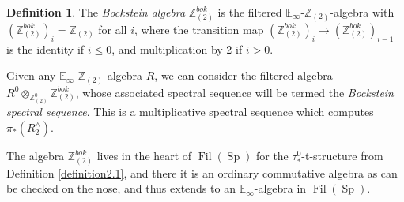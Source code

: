 \documentclass[11pt,leqno]{article}
\newcommand{\zz}{\mathbb{Z}}
\newcommand{\bb}[1]{\mathbb{#1}}
\newcommand{\mo}[1]{\operatorname{#1}}
\newtheorem*{short hand}{theorem name}
\theoremstyle{plain}  %
\theoremstyle{definition}
\newtheorem{definition}{Definition}[section]
\numberwithin{equation}{section}
\begin{document}
\begin{definition}\label{definition2.10}
The \textit{Bockstein algebra} $\zz_{(2)}^{bok}$ is the filtered $\bb{E}_{\infty}\text{-}\zz_{(2)}$-algebra with $(\zz_{(2)}^{bok})_i=\zz_{(2)}$ for all $i$, where the transition map $(\zz_{(2)}^{bok})_i\to (\zz_{(2)}^{bok})_{i-1}$ is the identity if $i\leq 0$, and multiplication by 2 if $i>0$.

Given any $\bb{E}_{\infty}\text{-}\zz_{(2)}$-algebra $R$, we can consider the filtered algebra $R^0\otimes_{\zz_{(2)}^0}\zz_{(2)}^{bok}$, whose associated spectral sequence will be termed the \textit{Bockstein spectral sequence}.  This is a multiplicative spectral sequence which computes $\pi_*(R_2^{\wedge})$.
\end{definition}
The algebra $\zz_{(2)}^{bok}$ lives in the heart of $\mo{Fil}(\mo{Sp})$ for the $\tau^0_{*}$-t-structure from Definition \ref{definition2.1}, and there it is an ordinary commutative algebra as can be checked on the nose, and thus extends to an $\bb{E}_{\infty}$-algebra in $\mo{Fil}(\mo{Sp})$.
\end{document}
